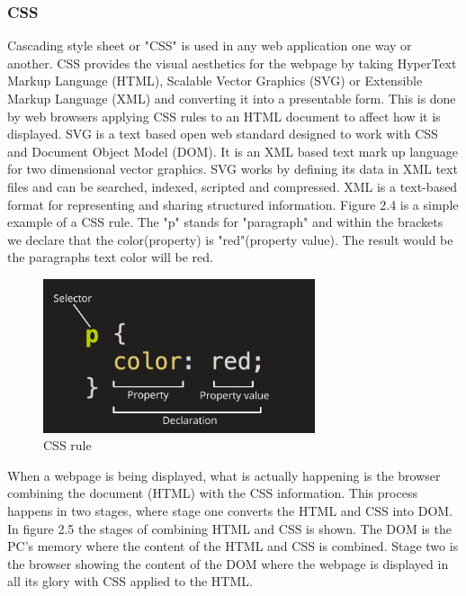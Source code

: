 \subsubsection{CSS} 
Cascading style sheet or "CSS" is used in any web application one way or another\cite{CSS_Introduction}. %
CSS provides the visual aesthetics for the webpage by taking HyperText Markup Language (HTML), Scalable Vector Graphics (SVG) or Extensible Markup Language (XML) and converting it into a presentable form\cite{What_is_CSS}. This is done by web browsers applying CSS rules to an HTML document to affect how it is displayed. SVG is a text based open web standard designed to work with CSS and Document Object Model (DOM). It is an XML based text mark up language for two dimensional vector graphics\cite{SVG_definition}. SVG works by defining its data in XML text files and can be searched, indexed, scripted and compressed\cite{SVG_functions}. XML is a text-based format for representing and sharing structured information\cite{What_is_XML}. Figure 2.4 is a simple example of a CSS rule. The "p" stands for "paragraph" and within the brackets we declare that the color(property) is "red"(property value). The result would be the paragraphs text color will be red.
\begin{figure}[h]
    \centering
    \includegraphics[width=80mm]{figures/css-declaration-small.png}
    \caption{CSS rule}
    \label{fig:Css rule example}
\end{figure}
When a webpage is being displayed, what is actually happening is the browser combining the document (HTML) with the CSS information\cite{CSS_and_DOM}. This process happens in two stages, where stage one converts the HTML and CSS into DOM\cite{What_is_DOM}. In figure 2.5 the stages of combining HTML and CSS is shown. The DOM is the PC's memory where the content of the HTML and CSS is combined. Stage two is the browser showing the content of the DOM where the webpage is displayed in all its glory with CSS applied to the HTML.

